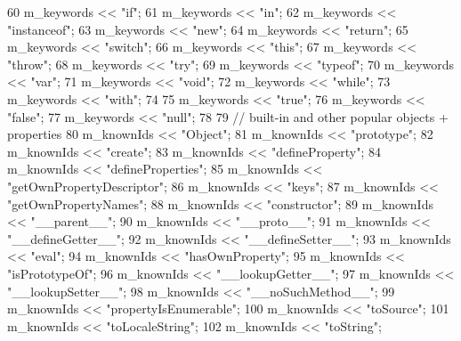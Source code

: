 \begin{DoxyCode}
60     m\_keywords << \textcolor{stringliteral}{"if"};
61     m\_keywords << \textcolor{stringliteral}{"in"};
62     m\_keywords << \textcolor{stringliteral}{"instanceof"};
63     m\_keywords << \textcolor{stringliteral}{"new"};
64     m\_keywords << \textcolor{stringliteral}{"return"};
65     m\_keywords << \textcolor{stringliteral}{"switch"};
66     m\_keywords << \textcolor{stringliteral}{"this"};
67     m\_keywords << \textcolor{stringliteral}{"throw"};
68     m\_keywords << \textcolor{stringliteral}{"try"};
69     m\_keywords << \textcolor{stringliteral}{"typeof"};
70     m\_keywords << \textcolor{stringliteral}{"var"};
71     m\_keywords << \textcolor{stringliteral}{"void"};
72     m\_keywords << \textcolor{stringliteral}{"while"};
73     m\_keywords << \textcolor{stringliteral}{"with"};
74 
75     m\_keywords << \textcolor{stringliteral}{"true"};
76     m\_keywords << \textcolor{stringliteral}{"false"};
77     m\_keywords << \textcolor{stringliteral}{"null"};
78 
79     \textcolor{comment}{// built-in and other popular objects + properties}
80     m\_knownIds << \textcolor{stringliteral}{"Object"};
81     m\_knownIds << \textcolor{stringliteral}{"prototype"};
82     m\_knownIds << \textcolor{stringliteral}{"create"};
83     m\_knownIds << \textcolor{stringliteral}{"defineProperty"};
84     m\_knownIds << \textcolor{stringliteral}{"defineProperties"};
85     m\_knownIds << \textcolor{stringliteral}{"getOwnPropertyDescriptor"};
86     m\_knownIds << \textcolor{stringliteral}{"keys"};
87     m\_knownIds << \textcolor{stringliteral}{"getOwnPropertyNames"};
88     m\_knownIds << \textcolor{stringliteral}{"constructor"};
89     m\_knownIds << \textcolor{stringliteral}{"\_\_parent\_\_"};
90     m\_knownIds << \textcolor{stringliteral}{"\_\_proto\_\_"};
91     m\_knownIds << \textcolor{stringliteral}{"\_\_defineGetter\_\_"};
92     m\_knownIds << \textcolor{stringliteral}{"\_\_defineSetter\_\_"};
93     m\_knownIds << \textcolor{stringliteral}{"eval"};
94     m\_knownIds << \textcolor{stringliteral}{"hasOwnProperty"};
95     m\_knownIds << \textcolor{stringliteral}{"isPrototypeOf"};
96     m\_knownIds << \textcolor{stringliteral}{"\_\_lookupGetter\_\_"};
97     m\_knownIds << \textcolor{stringliteral}{"\_\_lookupSetter\_\_"};
98     m\_knownIds << \textcolor{stringliteral}{"\_\_noSuchMethod\_\_"};
99     m\_knownIds << \textcolor{stringliteral}{"propertyIsEnumerable"};
100     m\_knownIds << \textcolor{stringliteral}{"toSource"};
101     m\_knownIds << \textcolor{stringliteral}{"toLocaleString"};
102     m\_knownIds << \textcolor{stringliteral}{"toString"};

\end{DoxyCode}
